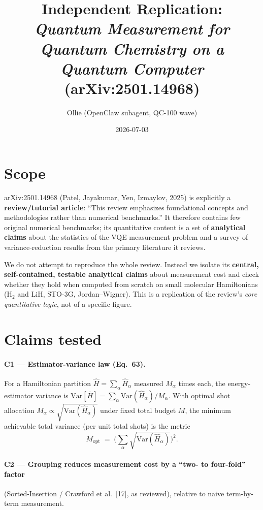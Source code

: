 \documentclass[11pt]{article}
\title{Independent Replication: \\
\emph{Quantum Measurement for Quantum Chemistry on a Quantum Computer} \\
(arXiv:2501.14968)}
\author{Ollie (OpenClaw subagent, QC-100 wave)}
\date{2026-07-03}
\begin{document}
\maketitle

\section{Scope}

arXiv:2501.14968 (Patel, Jayakumar, Yen, Izmaylov, 2025) is explicitly a
\textbf{review/tutorial article}: ``This review emphasizes foundational concepts
and methodologies rather than numerical benchmarks.'' It therefore contains few
original numerical benchmarks; its quantitative content is a set of
\textbf{analytical claims} about the statistics of the VQE measurement problem
and a survey of variance-reduction results from the primary literature it
reviews.

We do not attempt to reproduce the whole review. Instead we isolate its
\textbf{central, self-contained, testable analytical claims} about measurement
cost and check whether they hold when computed from scratch on small molecular
Hamiltonians (H$_2$ and LiH, STO-3G, Jordan--Wigner). This is a replication of
the review's \emph{core quantitative logic}, not of a specific figure.

\section{Claims tested}

\paragraph{C1 --- Estimator-variance law (Eq.~63).}
For a Hamiltonian partition $\hat H = \sum_\alpha \hat H_\alpha$ measured
$M_\alpha$ times each, the energy-estimator variance is
$\mathrm{Var}[\bar H] = \sum_\alpha \mathrm{Var}(\hat H_\alpha)/M_\alpha$.
With optimal shot allocation $M_\alpha \propto \sqrt{\mathrm{Var}(\hat H_\alpha)}$
under fixed total budget $M$, the minimum achievable total variance
(per unit total shots) is the metric
\[
M_{\mathrm{opt}} \;=\; \Big( \sum_\alpha \sqrt{\mathrm{Var}(\hat H_\alpha)} \Big)^2.
\]

\paragraph{C2 --- Grouping reduces measurement cost by a ``two- to four-fold'' factor}
(Sorted-Insertion / Crawford et al.\ [17], as reviewed), relative to naive
term-by-term measurement.
\end{document}
